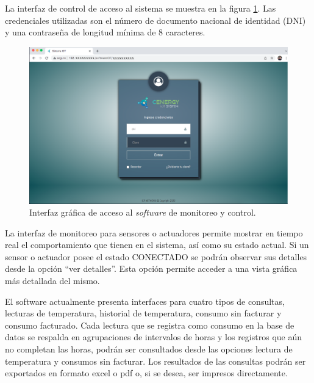 La interfaz de control de acceso al sistema se muestra en la figura \ref{fig:gui0}. Las credenciales utilizadas son el número de documento nacional de identidad (DNI) y una contraseña de longitud mínima de 8 caracteres.
\vspace{0.5cm}
\begin{figure}[htpb]
\centering 
\includegraphics[width=1.0\textwidth]{./Figures/gui/0.png}
\caption{Interfaz gráfica de acceso al  \emph{software} de monitoreo y control.}
\label{fig:gui0}
\end{figure}
\vspace{0.5cm}

La interfaz de monitoreo para sensores o actuadores permite mostrar en tiempo real el comportamiento que tienen en el sistema, así como su estado actual. Si un sensor o actuador posee el estado CONECTADO se podrán observar sus detalles desde la opción ``ver detalles''. Esta opción permite acceder a una vista gráfica más detallada del mismo. 

El software actualmente presenta interfaces para cuatro tipos de consultas, lecturas de temperatura, historial de temperatura, consumo sin facturar y consumo facturado. Cada lectura que se registra como consumo en la base de datos se respalda en agrupaciones de intervalos de horas y los registros que aún no completan las horas, podrán ser consultados desde las opciones lectura de temperatura y consumos sin facturar. Los resultados de las consultas podrán ser exportados en formato excel o pdf o, si se desea, ser impresos directamente. %

